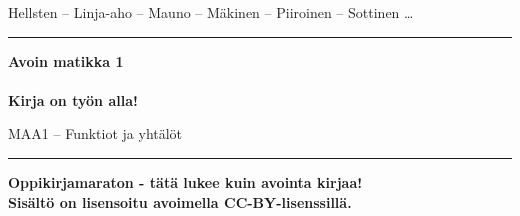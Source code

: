 \documentclass[a4paper,onecolumn,12pt,finnish,oneside,final]{boek3}
\begin{document}

\begin{titlepage}

  \begin{center}
    \begin{doublespace}
      \begin{LARGE}
        \textrm{Hellsten -- Linja-aho -- Mauno -- Mäkinen -- Piiroinen -- Sottinen \ldots} \\
      \end{LARGE}
      
      \vspace{0.5cm}
      \hrule height 2pt
      \vspace{1cm}
      \begin{Huge}
        \textbf{\textrm{Avoin matikka 1}\\\ \\Kirja on työn alla!}
      \end{Huge}
      
      \vfill
      
      \begin{huge}
        \textrm{MAA1 -- Funktiot ja yhtälöt}
      \end{huge}
      \vspace{1cm}
      \hrule height 2pt
    \end{doublespace}
  \end{center}
  
  \vfill
  \begin{flushright}
    \textbf{Oppikirjamaraton - tätä lukee kuin avointa kirjaa! \\
      Sisältö on lisensoitu avoimella CC-BY-lisenssillä. \\
    }
  \end{flushright}
  
\end{titlepage}

\tableofcontents







\end{document}
